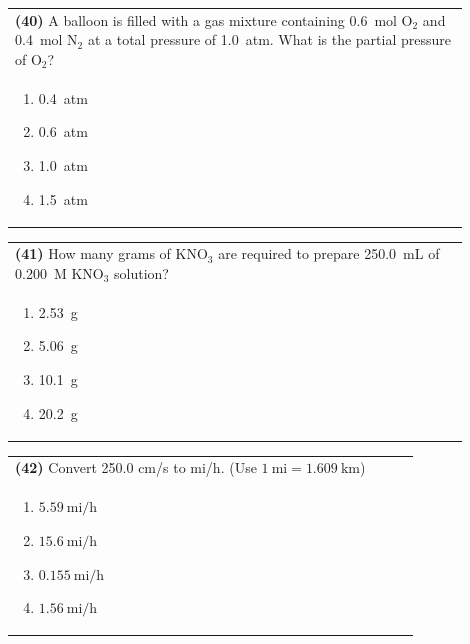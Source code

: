 \documentclass{article}
\begin{document}
\noindent\begin{tabular}{|p{0.9\linewidth}|}
\hline
\textbf{(40)} A balloon is filled with a gas mixture containing 0.6~mol O$_2$ and 0.4~mol N$_2$ at a total pressure of 1.0~atm. What is the partial pressure of O$_2$?\\[0.2cm]
\begin{minipage}[t]{0.85\linewidth}
\begin{enumerate}[label=\alph*.]
\item 0.4~atm
\item 0.6~atm
\item 1.0~atm
\item 1.5~atm
\end{enumerate}
\end{minipage}\\[0.2cm]
\hline
\end{tabular}

\noindent\begin{tabular}{|p{0.9\linewidth}|}
\hline
\textbf{(41)} How many grams of KNO$_3$ are required to prepare 250.0~mL of 0.200~M KNO$_3$ solution?\\[0.2cm]
\begin{minipage}[t]{0.85\linewidth}
\begin{enumerate}[label=\alph*.]
\item 2.53~g
\item 5.06~g
\item 10.1~g
\item 20.2~g
\end{enumerate}
\end{minipage}\\[0.2cm]
\hline
\end{tabular}

\noindent\begin{tabular}{|p{0.9\linewidth}|}
\hline
\textbf{(42)} Convert 250.0 cm/s to mi/h. (Use $1~\text{mi}=1.609~\text{km}$) \\
\begin{minipage}[t]{0.85\linewidth}
\begin{enumerate}[label=\alph*.]
    \item $5.59~\text{mi/h}$
    \item $15.6~\text{mi/h}$
    \item $0.155~\text{mi/h}$
    \item $1.56~\text{mi/h}$
\end{enumerate}
\end{minipage}\\[0.2cm]
\hline
\end{tabular}
\end{document}
